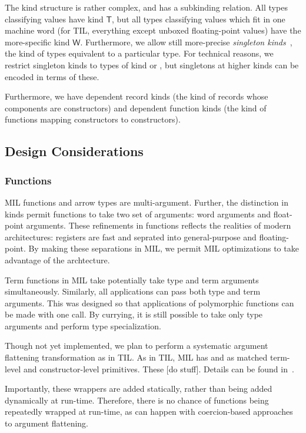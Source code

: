 \documentclass[12pt,twoside]{article}
\begin{document}
The kind structure is rather complex, and has a subkinding
relation.  All types classifying values have kind $\mathsf{T}$, but
all types classifying values which fit in one machine word
(for TIL, everything except unboxed floating-point values) have
the more-specific kind $\mathsf{W}$.  Furthermore, we allow
still more-precise \textit{singleton kinds}~\cite{???}, 
the kind of types equivalent to a particular type.
For technical reasons, we restrict singleton kinds to
types of kind  or , but singletons at higher
kinds can be encoded in terms of these.

Furthermore, we have dependent record kinds (the kind of
records whose components are constructors) and dependent function
kinds (the kind of functions mapping constructors to constructors).

\subsection{Design Considerations}

\subsubsection{Functions}

MIL functions and arrow types are multi-argument.  Further, the
distinction in kinds permit functions to take two set of arguments:
word arguments and float-point arguments.  These refinements in
functions reflects the realities of modern architectures: registers are
fast and seprated into general-purpose and floating-point.  By making
these separations in MIL, we permit MIL optimizations to take
advantage of the archtecture.

Term functions in MIL take potentially take type and term arguments
simultaneously.  Similarly, all applications can pass both type and
term arguments.  This was designed so that applications of polymorphic
functions can be made with one call.  By currying, it is still
possible to take only type arguments and perform type specialization.

Though not yet implemented, we plan to perform a systematic argument
flattening transformation as in TIL.  As in TIL, MIL has  and
 as matched term-level and constructor-level primitives.  
These [do stuff].  Details can be found in~\cite{???}.

Importantly, these wrappers are added statically, rather than being
added dynamically at run-time.  Therefore, there is no chance of
functions being repeatedly wrapped at run-time, as can happen with
coercion-based approaches to argument flattening.
\end{document}

